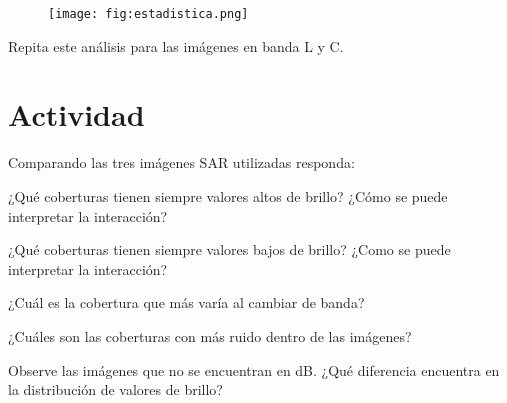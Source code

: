 \begin{figure}[h!]
    \centering
    \texttt{[image: fig:estadistica.png]}
    \caption{}
    \label{fig:estadistica}
\end{figure}

Repita este análisis para las imágenes en banda L y C.

\section{Actividad}

Comparando las tres imágenes SAR utilizadas responda:

\begin{que}
    ¿Qué coberturas tienen siempre valores altos de brillo? ¿Cómo se puede interpretar la interacción?
\end{que}

\begin{que}
    ¿Qué coberturas tienen siempre valores bajos de brillo? ¿Como se puede interpretar la interacción?
\end{que}

\begin{que}
    ¿Cuál es la cobertura que más varía al cambiar de banda?
\end{que}

\begin{que}
    ¿Cuáles son las coberturas con más ruido dentro de las imágenes?
\end{que}

\begin{que}
    Observe las imágenes que no se encuentran en dB. ¿Qué diferencia encuentra en la distribución de valores de brillo?
\end{que}
